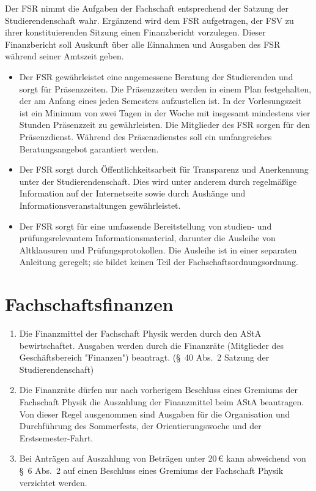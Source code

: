 \documentclass[
	a4paper,
	12pt,
	oneside,
	parskip=half-,
	pagesize,
	headsepline,
	german,
	ngerman
]{scrartcl}
\begin{document}
Der FSR nimmt die Aufgaben der Fachschaft entsprechend der Satzung der Studierendenschaft wahr. Ergänzend wird dem FSR aufgetragen, der FSV zu ihrer konstituierenden Sitzung einen Finanzbericht vorzulegen. Dieser Finanzbericht soll Auskunft über alle Einnahmen und Ausgaben des FSR während seiner Amtszeit geben.

\begin{itemize}
	\item Der FSR gewährleistet eine angemessene Beratung der Studierenden und sorgt für Präsenzzeiten. Die Präsenzzeiten werden in einem Plan festgehalten, der am Anfang eines jeden Semesters aufzustellen ist. In der Vorlesungszeit ist ein Minimum von zwei Tagen in der Woche mit insgesamt mindestens vier Stunden Präsenzzeit zu gewährleisten. Die Mitglieder des FSR sorgen für den Präsenzdienst. Während des Präsenzdienstes soll ein umfangreiches Beratungsangebot garantiert werden.
	\item Der FSR sorgt durch Öffentlichkeitsarbeit für Transparenz und Anerkennung unter der Studierendenschaft. Dies wird unter anderem durch regelmäßige Information auf der Internetseite sowie durch Aushänge und Informationsveranstaltungen gewährleistet.
	\item Der FSR sorgt für eine umfassende Bereitstellung von studien- und prüfungsrelevantem Informationsmaterial, darunter die Ausleihe von Altklausuren und Prüfungsprotokollen. Die Ausleihe ist in einer separaten Anleitung geregelt; sie bildet keinen Teil der Fachschaftsordnungsordnung.
\end{itemize}


\section{Fachschaftsfinanzen}
\label{sec:Finanzen}

\begin{enumerate}
	\item Die Finanzmittel der Fachschaft Physik werden durch den AStA bewirtschaftet. Ausgaben werden durch die Finanzräte (Mitglieder des Geschäftsbereich "Finanzen") beantragt. (§~40 Abs.~2 Satzung der Studierendenschaft)
	\item Die Finanzräte dürfen nur nach vorherigem Beschluss eines Gremiums der Fachschaft Physik die Auszahlung der Finanzmittel beim AStA beantragen. Von dieser Regel ausgenommen sind Ausgaben für die Organisation und Durchführung des Sommerfests, der Orientierungswoche und der Erstsemester-Fahrt.
	\label{Finanzen_2}
	\item Bei Anträgen auf Auszahlung von Beträgen unter 20\,€ kann abweichend von §~6 Abs.~2 auf einen Beschluss eines Gremiums der Fachschaft Physik verzichtet werden.
\end{enumerate}
\end{document}
